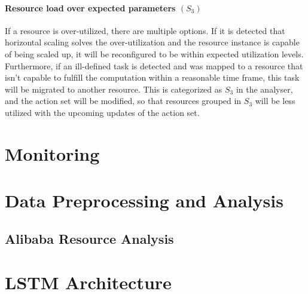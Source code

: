 \paragraph*{Resource load over expected parameters $(S_3)$} 
If a resource is over-utilized, there are multiple options. If it is detected that horizontal scaling solves the over-utilization and the resource instance is capable of being scaled up, it will be reconfigured to be within expected utilization levels. Furthermore, if an ill-defined task is detected and was mapped to a resource that isn't capable to fulfill the computation within a reasonable time frame, this task will be migrated to another resource. 
This is categorized as $S_3$ in the analyser, and the action set will be modified, so that resources grouped in $S_3$ will be less utilized with the upcoming updates of the action set. \cite{kimovskiBigDataPipeline2022}


\section{Monitoring}

\section{Data Preprocessing and Analysis}

  \subsection{Alibaba Resource Analysis}
\section{LSTM Architecture}
\label{sec:lstm-architecture-and-implementation}

